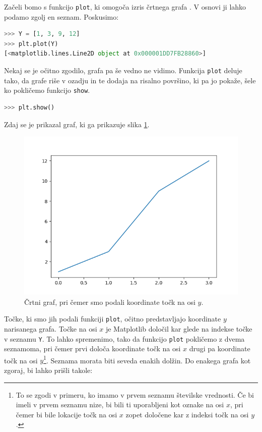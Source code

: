 Začeli bomo s funkcijo \texttt{plot}, ki omogoča izris črtnega grafa . V osnovi ji lahko podamo zgolj en seznam. Poskusimo:
\begin{lstlisting}[language=Python]
>>> Y = [1, 3, 9, 12]
>>> plt.plot(Y)
[<matplotlib.lines.Line2D object at 0x000001DD7FB28860>]
\end{lstlisting}
Nekaj se je očitno zgodilo, grafa pa še vedno ne vidimo. Funkcija \texttt{plot} deluje tako, da grafe riše v ozadju in te dodaja na risalno površino, ki pa jo pokaže, šele ko pokličemo funkcijo \texttt{show}.
\begin{lstlisting}[language=Python, showstringspaces=false]
>>> plt.show()
\end{lstlisting}
Zdaj se je prikazal graf, ki ga prikazuje slika \ref{img:plt1}.
\begin{figure}
    \includegraphics[width=\linewidth]{img/plt1.png}
    \caption{Črtni graf, pri čemer smo podali koordinate točk na osi $y$.}
    \label{img:plt1}
\end{figure}
Točke, ki smo jih podali funkciji \texttt{plot}, očitno predstavljajo koordinate $y$ narisanega grafa. Točke na osi $x$ je Matplotlib določil kar glede na indekse točke v seznamu \texttt{Y}. To lahko spremenimo, tako da funkcijo \texttt{plot} pokličemo z dvema seznamoma, pri čemer prvi določa koordinate točk na osi $x$ drugi pa koordinate točk na osi $y$\footnote{To se zgodi v primeru, ko imamo v prvem seznamu številske vrednosti. Če bi imeli v prvem seznamu nize, bi bili ti uporabljeni kot oznake na osi $x$, pri čemer bi bile lokacije točk na osi $x$ zopet določene kar z indeksi točk na osi $y$.}. Seznama morata biti seveda enakih dolžin. Do enakega grafa kot zgoraj, bi lahko prišli takole: 
